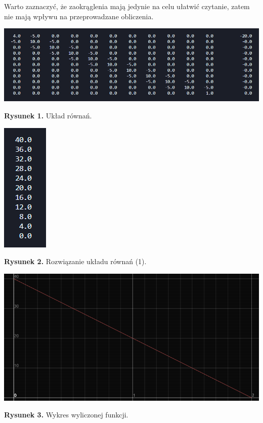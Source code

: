 \documentclass[12pt]{article}
\begin{document}
\noindent Warto zaznaczyć, że zaokrąglenia mają jedynie na celu ułatwić czytanie, zatem nie 
mają wpływu na przeprowadzane obliczenia.


\vskip 1cm
\begin{center}
	\includegraphics[width=\textwidth]{matrix_ab.png}

	\textbf{Rysunek 1.} Układ równań.
\end{center}

\vskip 1cm
\begin{center}
	\includegraphics[]{matrix_c.png}

	\textbf{Rysunek 2.} Rozwiązanie układu równań (1).
\end{center}

\vskip 1cm
\begin{center}
	\includegraphics[width=\textwidth]{chart.png}

	\textbf{Rysunek 3.} Wykres wyliczonej funkcji.
\end{center}
\end{document}

